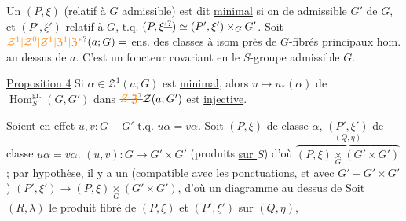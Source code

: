 Un $(P,\xi)$  (relatif à $G$ admissible)
est dit \uline{minimal} si on 
de  admissible $G'$ de $G$, et
$(P',\xi')$ relatif à $G$, t.q. $(P,\xi\deleted{\unsure{'}})\simeq(P',\xi')\times_G G'$.
 Soit $\unsure{\mathcal Z^{1}|\mathcal Z^{0}|Z^{1}|\mathfrak Z^{1}|\mathfrak Z^{*}}(a;G)=$ ens. des classes à isom
près de $G$-fibrés principaux hom. \uline{} au
dessus de $a$. C'est un foncteur covariant en
le $S$-groupe admissible $G$.

\uline{Proposition 4} Si $\alpha\in\mathcal Z^{1}(a;G)$ est \uline{minimal},
alors $u\longmapsto u_{*}(\alpha)$ de $\operatorname{Hom}^{\mathrm{gr}.}_{S}(G,G')$ dans
$\deleted{\unsure{Z|\mathfrak Z}}\mathcal Z(a;G')$ est \uline{injective}.

Soient en effet $u,v:G\mathbin{-}G'$ t.q.
$u\alpha=v\alpha$. Soit $(P,\xi)$ de classe $\alpha$,
$(P',\xi')$ de classe $u\alpha=v\alpha$, $(u,v):G\to G'\times G'$ 
(produits \uline{sur $S$}) d'où $\overbrace{(P,\xi)\mathbin{\underset{G}{\times}}(G'\times G')}^{(Q,\eta)}$ ;
par hypothèse, il y a un 
(compatible avec les ponctuations, et avec 
$G'\mathbin{-}G'\times G'$) $(P',\xi')\longrightarrow(P,\xi)\mathbin{\underset{G}{\times}}(G'\times G')$, d'où
un diagramme
au dessus de
Soit $(R,\lambda)$ le produit fibré de
$(P,\xi)$ et $(P',\xi')$ sur $(Q,\eta)$,
